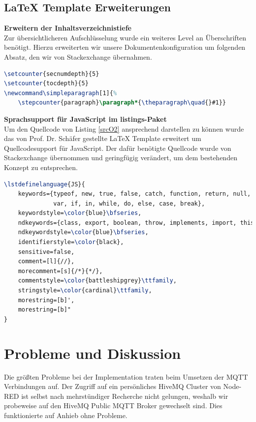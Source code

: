 \documentclass[12pt,oneside]{article}
\begin{document}
  		
  		
  		
  		
  \subsection{\LaTeX{} Template Erweiterungen}
    \textbf{Erweitern der Inhaltsverzeichnistiefe}\\[0.3cm]
      Zur übersichtlicheren Aufschlüsselung wurde ein weiteres Level an Überschriften benötigt. Hierzu erweiterten wir unsere Dokumentenkonfiguration um folgenden Absatz, den wir von Stackexchange\cite{texTocDepth} übernahmen.
      \begin{lstlisting}[language=tex, caption={\LaTeX{} Quellcode zum Anzeigen einer vierten Inhaltsverzeichnisebene}, captionpos=b, label=srcTocDepth]
\setcounter{secnumdepth}{5}
\setcounter{tocdepth}{5}
\newcommand\simpleparagraph[1]{%
	\stepcounter{paragraph}\paragraph*{\theparagraph\quad{}#1}}
	 \end{lstlisting}
   	
	\textbf{Sprachsupport für JavaScript im listings-Paket}\\[0.3cm]
	  Um den Quellcode von Listing \ref{srcO2} ansprechend darstellen zu können wurde das von Prof. Dr. Schäfer gestellte \LaTeX{} Template erweitert um Quellcodesupport für JavaScript\cite{texJsInclusion}. Der dafür benötigte Quellcode wurde von Stackexchange übernommen und geringfügig verändert, um dem bestehenden Konzept zu entsprechen.
	  \begin{lstlisting}[language=tex, caption={\LaTeX{} Quellcode für JavaScript Support im Paket listings}, captionpos=b, label=srcJS]
\lstdefinelanguage{JS}{
	keywords={typeof, new, true, false, catch, function, return, null, catch, switch,
		      var, if, in, while, do, else, case, break},
	keywordstyle=\color{blue}\bfseries,
	ndkeywords={class, export, boolean, throw, implements, import, this},
	ndkeywordstyle=\color{blue}\bfseries,
	identifierstyle=\color{black},
	sensitive=false,
	comment=[l]{//},
	morecomment=[s]{/*}{*/},
	commentstyle=\color{battleshipgrey}\ttfamily,
	stringstyle=\color{cardinal}\ttfamily,
	morestring=[b]',
	morestring=[b]"
}
  	  \end{lstlisting}
	  
  
  \section{Probleme und Diskussion}
	Die grö\ss ten Probleme bei der Implementation traten beim Umsetzen der MQTT Verbindungen auf. Der Zugriff auf ein persönliches HiveMQ Cluster von Node-RED ist selbst nach mehrstündiger Recherche nicht gelungen, weshalb wir probeweise auf den HiveMQ Public MQTT Broker gewechselt sind. Dies funktionierte auf Anhieb ohne Probleme.
  
\end{document}
